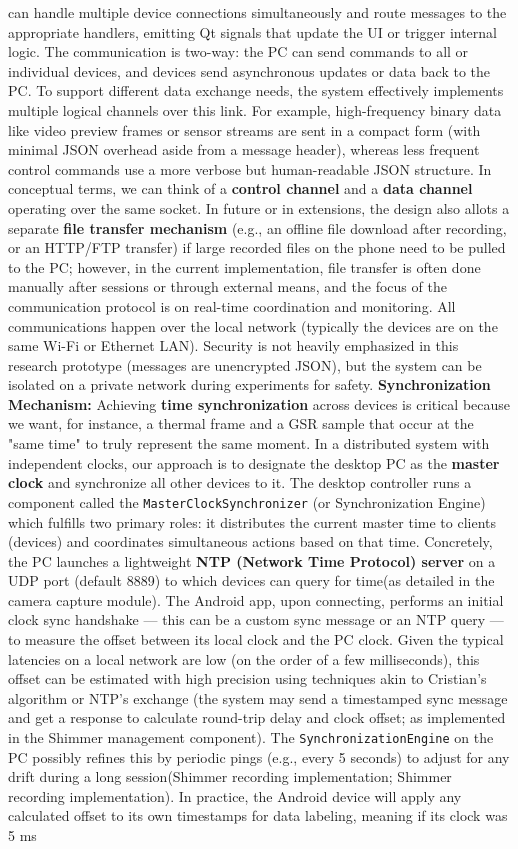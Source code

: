 can handle multiple device connections simultaneously and route messages to the appropriate handlers, emitting Qt signals that update the UI or trigger internal logic. The communication is two-way: the PC can send commands to all or individual devices, and devices send asynchronous updates or data back to the PC. To support different data exchange needs, the system effectively implements multiple logical channels over this link. For example, high-frequency binary data like video preview frames or sensor streams are sent in a compact form (with minimal JSON overhead aside from a message header), whereas less frequent control commands use a more verbose but human-readable JSON structure. In conceptual terms, we can think of a \textbf{control channel} and a \textbf{data channel} operating over the same socket. In future or in extensions, the design also allots a separate \textbf{file transfer mechanism} (e.g., an offline file download after recording, or an HTTP/FTP transfer) if large recorded files on the phone need to be pulled to the PC; however, in the current implementation, file transfer is often done manually after sessions or through external means, and the focus of the communication protocol is on real-time coordination and monitoring. All communications happen over the local network (typically the devices are on the same Wi-Fi or Ethernet LAN). Security is not heavily emphasized in this research prototype (messages are unencrypted JSON), but the system can be isolated on a private network during experiments for safety. \textbf{Synchronization Mechanism:} Achieving \textbf{time synchronization} across devices is critical because we want, for instance, a thermal frame and a GSR sample that occur at the "same time" to truly represent the same moment. In a distributed system with independent clocks, our approach is to designate the desktop PC as the \textbf{master clock} and synchronize all other devices to it. The desktop controller runs a component called the \texttt{MasterClockSynchronizer} (or Synchronization Engine) which fulfills two primary roles: it distributes the current master time to clients (devices) and coordinates simultaneous actions based on that time. Concretely, the PC launches a lightweight \textbf{NTP (Network Time Protocol) server} on a UDP port (default 8889) to which devices can query for time(as detailed in the camera capture module). The Android app, upon connecting, performs an initial clock sync handshake --- this can be a custom sync message or an NTP query --- to measure the offset between its local clock and the PC clock. Given the typical latencies on a local network are low (on the order of a few milliseconds), this offset can be estimated with high precision using techniques akin to Cristian's algorithm or NTP's exchange (the system may send a timestamped sync message and get a response to calculate round-trip delay and clock offset; as implemented in the Shimmer management component). The \texttt{SynchronizationEngine} on the PC possibly refines this by periodic pings (e.g., every 5 seconds) to adjust for any drift during a long session(Shimmer recording implementation; Shimmer recording implementation). In practice, the Android device will apply any calculated offset to its own timestamps for data labeling, meaning if its clock was 5 ms 